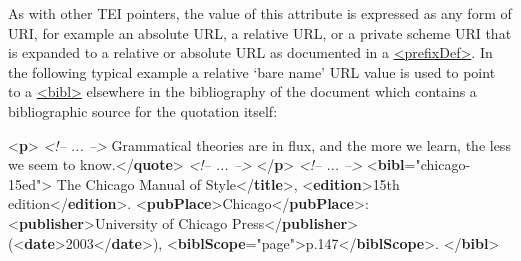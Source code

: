 As with other TEI pointers, the value of this attribute is expressed as any form of URI, for example an absolute URL, a relative URL, or a private scheme URI that is expanded to a relative or absolute URL as documented in a \hyperref[TEI.prefixDef]{<prefixDef>}. In the following typical example a relative ‘bare name’ URL value is used to point to a \hyperref[TEI.bibl]{<bibl>} elsewhere in the bibliography of the document which contains a bibliographic source for the quotation itself: \par\bgroup{}\exampleFont \begin{shaded}\noindent\mbox{}{<\textbf{p}>}\mbox{}\newline 
\textit{<!-- ... -->}\mbox{}\newline 
{}Grammatical theories\mbox{}\newline 
\hspace*{1em}\hspace*{1em} are in flux, and the more we learn, the less we\mbox{}\newline 
\hspace*{1em}\hspace*{1em} seem to know.{</\textbf{quote}>}\mbox{}\newline 
\textit{<!-- ... -->}\mbox{}\newline 
{</\textbf{p}>}\mbox{}\newline 
\textit{<!-- ... -->}\mbox{}\newline 
{<\textbf{bibl}\hspace*{1em}{xml:id}="{chicago-15\textunderscore ed}">}\mbox{}\newline 
{}The Chicago Manual of Style{</\textbf{title}>},\mbox{}\newline 
{<\textbf{edition}>}15th edition{</\textbf{edition}>}.\mbox{}\newline 
{<\textbf{pubPlace}>}Chicago{</\textbf{pubPlace}>}:\mbox{}\newline 
{<\textbf{publisher}>}University of Chicago Press{</\textbf{publisher}>} \mbox{}\newline 
 ({<\textbf{date}>}2003{</\textbf{date}>}),\mbox{}\newline 
{<\textbf{biblScope}\hspace*{1em}{unit}="{page}">}p.147{</\textbf{biblScope}>}.\mbox{}\newline 
\mbox{}\newline 
{</\textbf{bibl}>}\end{shaded}\egroup\par \par

